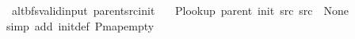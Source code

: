 \begin{isabellebody}
{}
\isamarkuptrue%
%
\endisatagdocument
{\isafolddocument}%
%
\isadelimdocument
%
\endisadelimdocument
{}\isamarkupfalse%
\ {\isacharparenleft}{\kern0pt}\ alt{\isacharunderscore}{\kern0pt}bfs{\isacharunderscore}{\kern0pt}valid{\isacharunderscore}{\kern0pt}input{\isacharparenright}{\kern0pt}\ parent{\isacharunderscore}{\kern0pt}src{\isacharunderscore}{\kern0pt}init{\isacharcolon}{\kern0pt}\isanewline
\ \ \ {\isachardoublequoteopen}P{\isacharunderscore}{\kern0pt}lookup\ {\isacharparenleft}{\kern0pt}parent\ {\isacharparenleft}{\kern0pt}init\ src{\isacharparenright}{\kern0pt}{\isacharparenright}{\kern0pt}\ src\ {\isacharequal}{\kern0pt}\ None{\isachardoublequoteclose}\isanewline
%
\isadelimproof
\ \ %
\endisadelimproof
%
\isatagproof
{}\isamarkupfalse%
\ {\isacharparenleft}{\kern0pt}simp\ add{\isacharcolon}{\kern0pt}\ init{\isacharunderscore}{\kern0pt}def\ P{\isachardot}{\kern0pt}map{\isacharunderscore}{\kern0pt}empty{\isacharparenright}{\kern0pt}%
\endisatagproof
{\isafoldproof}%
%
\isadelimproof
%
\endisadelimproof
%
\isadelimdocument
%
\endisadelimdocument
%
\isatagdocument
%

\end{isabellebody}

